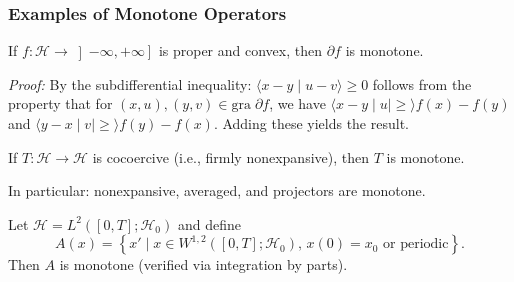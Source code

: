\documentclass[aspectratio=169,10pt]{beamer}
\newcommand{\gra}{\mathrm{gra}\;}
\newcommand{\inprod}[2]{\langle #1 \mid #2 \rangle}
\newcommand{\set}[1]{\left\{#1\right\}}
\newcommand{\Hilbert}{\mathcal{H}}
\begin{document}
\begin{frame}
    \frametitle{Examples of Monotone Operators}

    \begin{example}
        If $f : \Hilbert \to \left]-\infty, +\infty\right]$ is proper and convex, then $\partial f$ is monotone.

        \textit{Proof:} By the subdifferential inequality: $\inprod{x-y}{u-v} \geq 0$ follows from the property that
        for $(x,u), (y,v) \in \gra \partial f$, we have $\inprod{x-y \mid u} \geq f(x) - f(y)$ and
        $\inprod{y-x \mid v} \geq f(y) - f(x)$. Adding these yields the result.
    \end{example}

    \vspace{1em}

    \begin{example}
        If $T : \Hilbert \to \Hilbert$ is cocoercive (i.e., firmly nonexpansive), then $T$ is monotone.

        In particular: nonexpansive, averaged, and projectors are monotone.
    \end{example}

    \vspace{1em}

    \begin{example}
        Let $\Hilbert = L^2([0,T];\Hilbert_0)$ and define
        \[
            A(x) = \set{x' \mid x \in W^{1,2}([0,T];\Hilbert_0), \, x(0) = x_0 \text{ or periodic}}.
        \]
        Then $A$ is monotone (verified via integration by parts).
    \end{example}
\end{frame}
\end{document}
